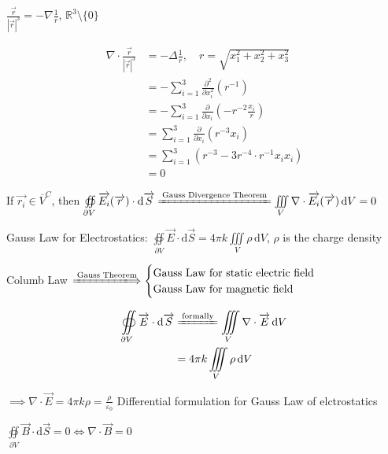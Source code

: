 $\frac{\overrightarrow{r}}{\left|\overrightarrow{r}\right|^3}=-\nabla\frac{1}{r}$, $\mathbb{R}^3\setminus\{0\}$

\begin{align*}
    \nabla\cdot\frac{\overrightarrow{r}}{\left|\overrightarrow{r}\right|^3}
     & =-\Delta\frac{1}{r},\quad r=\sqrt{x_1^2+x_2^2+x_3^2}                         \\
     & =-\sum_{i=1}^3\frac{\partial^2}{\partial x_i^2}(r^{-1})                      \\
     & =-\sum_{i=1}^3\frac{\partial}{\partial x_i}\left(-r^{-2}\frac{x_i}{r}\right) \\
     & =\sum_{i=1}^3\frac{\partial}{\partial x_i}(r^{-3}x_i)                        \\
     & =\sum_{i=1}^3(r^{-3}-3r^{-4}\cdot r^{-1}x_i x_i)                             \\
     & =0
\end{align*}

If $\overrightarrow{r_i}\in\overline{V}^C$, then $\oiint\limits_{\partial V}\overrightarrow{E_i}(\overrightarrow{r})\cdot\mathrm{d}\overrightarrow{S}\xlongequal{\text{Gauss Divergence Theorem}}\iiint\limits_{V}\nabla\cdot\overrightarrow{E_i}(\overrightarrow{r})\,\mathrm{d}V=0$

Gauss Law for Electrostatics: $\displaystyle\oiint\limits_{\partial V}\overrightarrow{E}\cdot\mathrm{d}\overrightarrow{S} = 4\pi k\iiint\limits_V\rho\,\mathrm{d}V$, $\rho$ is the charge density

Columb Law $\xLongrightarrow{\text{Gauss Theorem}}\begin{cases}
        \text{Gauss Law for static electric field} \\
        \text{Gauss Law for magnetic field}
    \end{cases}$

\begin{align*}
    \oiint\limits_{\partial V}\overrightarrow{E}\cdot\mathrm{d}\overrightarrow{S}
     & \xlongequal{\text{formally}}\iiint\limits_V\nabla\cdot\overrightarrow{E}\,\mathrm{d}V \\
     & =4\pi k\iiint\limits_V\rho\,\mathrm{d}V
\end{align*}

$\implies\nabla\cdot\overrightarrow{E}=4\pi k\rho=\frac{\rho}{\varepsilon_0}$ Differential formulation for Gauss Law of elctrostatics

$\oiint\limits_{\partial V}\overrightarrow{B}\cdot\mathrm{d}\overrightarrow{S}=0\iff\nabla\cdot\overrightarrow{B}=0$

